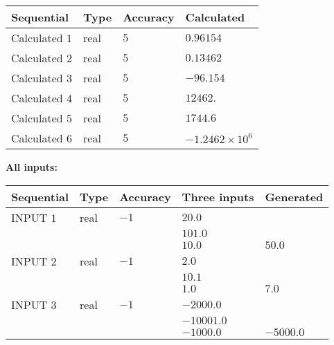 \documentclass[12pt]{article}
\begin{document}
   
   
   
\noindent{}
   
   
  
  
\noindent\begin{tabular}{|l|l|l|l|}
\hline
 Sequential & Type & Accuracy & Calculated \\ 
\hline
 
 
  Calculated $            1 $ & real & $            5  $ & 
 $ 0.96154 $ 
 \\  \hline  
 
 
  Calculated $            2 $ & real & $            5  $ & 
 $ 0.13462 $ 
 \\  \hline  
 
 
  Calculated $            3 $ & real & $            5  $ & 
 $ -96.154 $ 
 \\  \hline  
 
 
  Calculated $            4 $ & real & $            5  $ & 
 $ 12462. $ 
 \\  \hline  
 
 
  Calculated $            5 $ & real & $            5  $ & 
 $ 1744.6 $ 
 \\  \hline  
 
 
  Calculated $            6 $ & real & $            5  $ & 
 $ -1.2462 \times 10^{6} $ 
 \\  \hline  
 \end{tabular}
   
   
   
   
\noindent\vspace{0.1in}\hspace{-0.08in} {\textbf{\Large{All inputs: }}}
   
   
  
  
\noindent\begin{tabular}{|l|l|l|l|l|}
\hline
 Sequential & Type & Accuracy & Three inputs & Generated \\ 
\hline
 
 
  INPUT $            1 $ & real & $           -1  $ & $
 20.0
  $ & \\
  & & &  $
 101.0
  $ & \\
  & & &  $
 10.0
 $ & $ 50.0 $ 
 \\  \hline  
 
 
  INPUT $            2 $ & real & $           -1  $ & $
 2.0
  $ & \\
  & & &  $
 10.1
  $ & \\
  & & &  $
 1.0
 $ & $ 7.0 $ 
 \\  \hline  
 
 
  INPUT $            3 $ & real & $           -1  $ & $
 -2000.0
  $ & \\
  & & &  $
 -10001.0
  $ & \\
  & & &  $
 -1000.0
 $ & $ -5000.0 $ 
 \\  \hline  
 \end{tabular}
   
\end{document}
